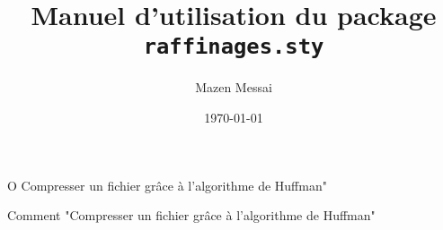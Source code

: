 \documentclass{article}
\title{Manuel d'utilisation du package \texttt{raffinages.sty}}
\author{Mazen Messai}
\date{\today}
\begin{document}
\begin{raffinage}{O}{ Compresser un fichier grâce à l’algorithme de Huffman"}
\end{raffinage}

\begin{raffinage}{1}{Comment "Compresser un fichier grâce à l’algorithme de Huffman"}

\end{raffinage}
\end{document}
